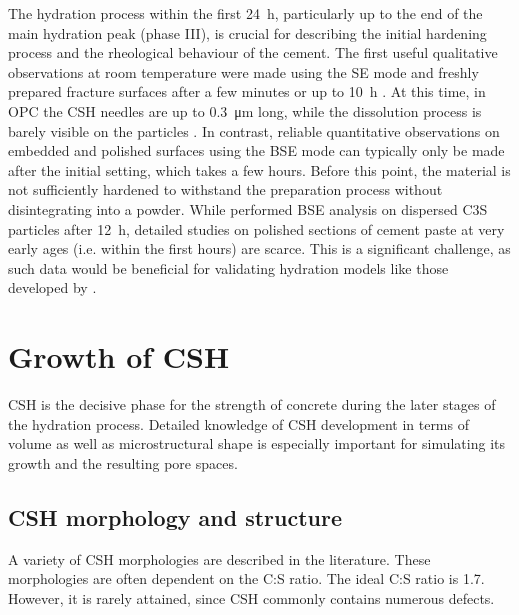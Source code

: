 The hydration process within the first \qty{24}{\hour}, particularly up to the end of the main hydration peak (phase III), is crucial for describing the initial hardening process and the rheological behaviour of the cement.
The first useful qualitative observations at room temperature were made using the \ac{SE} mode and freshly prepared fracture surfaces after a few minutes or up to \qty{10}{\hour} \cite{stark.2001,voland.2000,suess.2001}.
At this time, in \ac{OPC} the \ac{CSH} needles are up to \qty{0.3}{\micro\meter} long, while the dissolution process is barely visible on the particles \cite{voland.2000}.
In contrast, reliable quantitative observations on embedded and polished surfaces using the \ac{BSE} mode can typically only be made after the initial setting, which takes a few hours.
Before this point, the material is not sufficiently hardened to withstand the preparation process without disintegrating into a powder.
While \textcite{neubauer.2022} performed \ac{BSE} analysis on dispersed \ac{C3S} particles after \qty{12}{\hour}, detailed studies on polished sections of cement paste at very early ages (i.e. within the first hours) are scarce.
This is a significant challenge, as such data would be beneficial for validating hydration models like those developed by \textcite{nguyen-tuan.2024,nguyen-tuan.2026}.

\section{Growth of \acl*{CSH}}

\ac{CSH} is the decisive phase for the strength of concrete during the later stages of the hydration process.
Detailed knowledge of \ac{CSH} development in terms of volume as well as microstructural shape is especially important for simulating its growth \cite{breugel.1997,nguyen-tuan.2023,nguyen-tuan.2024} and the resulting pore spaces.

\subsection{\acs*{CSH} morphology and structure}

A variety of \ac{CSH} morphologies are described in the literature.
These morphologies are often dependent on the C:S ratio.
The ideal C:S ratio is \num{1.7}.
However, it is rarely attained, since \ac{CSH} commonly contains numerous defects.

